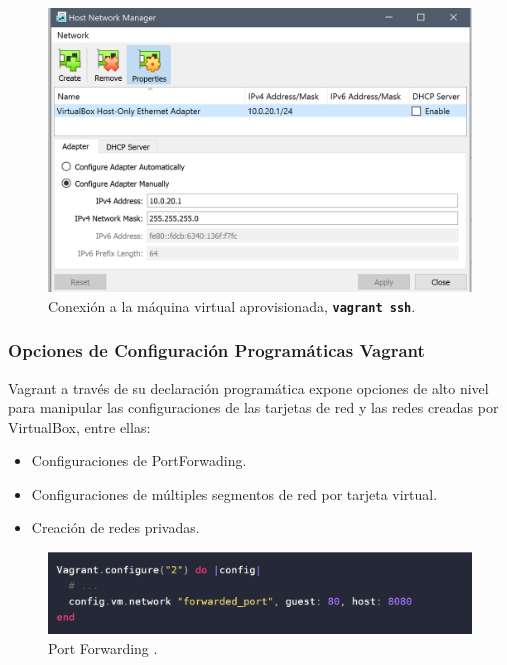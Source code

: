 \documentclass[letterpaper, 12pt, oneside]{article}
\begin{document}
    \begin{figure}[H]
        \includegraphics[scale=1]{img/networking/networking2.png}
        \caption{Conexión a la máquina virtual aprovisionada, \textbf{\texttt{vagrant ssh}}.}
        \label{fig:net2}
    \end{figure}
    \subsubsection{Opciones de Configuración Programáticas Vagrant}
    Vagrant a través de su declaración programática expone opciones de alto nivel para manipular las configuraciones de las tarjetas de red y las redes creadas por VirtualBox, entre ellas: 
    \begin{itemize}
        \item Configuraciones de PortForwading.
        \item Configuraciones de múltiples segmentos de red por tarjeta virtual.
        \item Creación de redes privadas.
    \end{itemize}
    
    
    \begin{figure}[H]
        \includegraphics[scale=0.8]{img/vagrantport/vagrantportforwading.png}
        \caption{Port Forwarding .}
        \label{fig:forward1}
    \end{figure}
    
\end{document}
